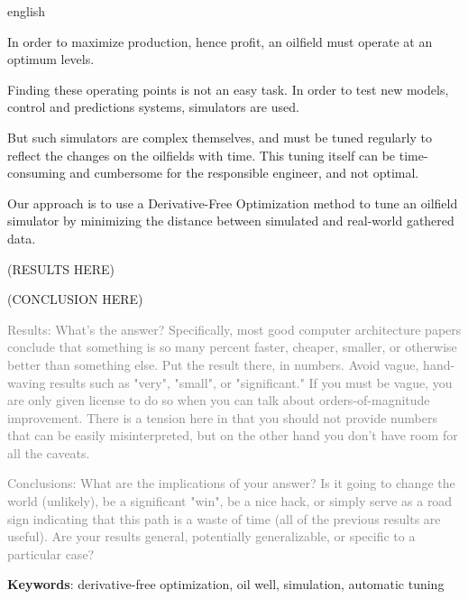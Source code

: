\begin{resumo}[Abstract]
 \begin{otherlanguage*}{english}


In order to maximize production, hence profit, an oilfield must operate at an optimum levels.

Finding these operating points is not an easy task. In order to test new models, control and predictions systems, simulators are used.

But such simulators are complex themselves, and must be tuned regularly to reflect the changes on the oilfields with time. This tuning itself can be time-consuming and cumbersome for the responsible engineer, and not optimal.

Our approach is to use a Derivative-Free Optimization method to tune an oilfield simulator by minimizing the distance between simulated and real-world gathered data.


(RESULTS HERE)

(CONCLUSION HERE)

\textcolor{gray}{
Results:
What's the answer? Specifically, most good computer architecture papers conclude that something is so many percent faster, cheaper, smaller, or otherwise better than something else. Put the result there, in numbers. Avoid vague, hand-waving results such as "very", "small", or "significant." If you must be vague, you are only given license to do so when you can talk about orders-of-magnitude improvement. There is a tension here in that you should not provide numbers that can be easily misinterpreted, but on the other hand you don't have room for all the caveats.}


\textcolor{gray}{
Conclusions:
What are the implications of your answer? Is it going to change the world (unlikely), be a significant "win", be a nice hack, or simply serve as a road sign indicating that this path is a waste of time (all of the previous results are useful). Are your results general, potentially generalizable, or specific to a particular case?
 }
   \vspace{\onelineskip}
 
   \noindent 
   \textbf{Keywords}: derivative-free optimization, oil well, simulation, automatic tuning
 \end{otherlanguage*}
\end{resumo}
